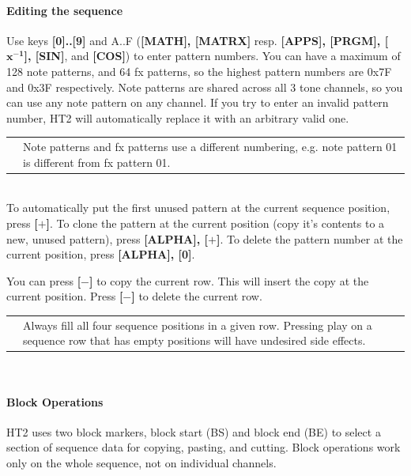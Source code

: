 \documentclass[12pt]{report}	%
\newcommand*{\TakeFourierOrnament}[1]{{%
\fontencoding{U}\fontfamily{futs}\selectfont\char#1}}
\newcommand*{\danger}{\TakeFourierOrnament{66}}
\begin{document}
\paragraph{Editing the sequence} Use keys \textbf{[0]..[9]} and A..F (\textbf{[MATH], [MATRX]} resp. \textbf{[APPS], [PRGM], [$\bm{x^{-1}}$], [SIN]}, and \textbf{[COS]}) to enter pattern numbers. You can have a maximum of 128 note patterns, and 64 fx patterns, so the highest pattern numbers are 0x7F and 0x3F respectively. Note patterns are shared across all 3 tone channels, so you can use any note pattern on any channel. If you try to enter an invalid pattern number, HT2 will automatically replace it with an arbitrary valid one.

\begin{tabularx}{\textwidth}{m{} X}
{\textcolor{red}{\newline\Huge\danger}} & Note patterns and fx patterns use a different numbering, e.g. note pattern 01 is different from fx pattern 01. \\
\end{tabularx} ~\\

To automatically put the first unused pattern at the current sequence position, press \textbf{[$\bm{+}$]}. To clone the pattern at the current position (copy it's contents to a new, unused pattern), press \textbf{[ALPHA], [$\bm{+}$]}. To delete the pattern number at the current position, press \textbf{[ALPHA], [0]}.

You can press \textbf{[$\bm{-}$]} to copy the current row. This will insert the copy at the current position. Press \textbf{[$\bm{-}$]} to delete the current row.

\begin{tabularx}{\textwidth}{m{} X}
\Huge{\textcolor{red}{\newline\danger}} & Always fill all four sequence positions in a given row. Pressing play on a sequence row that has empty positions will have undesired side effects. \\
\end{tabularx} ~\\

\paragraph{Block Operations} HT2 uses two block markers, block start (BS) and block end (BE) to select a section of sequence data for copying, pasting, and cutting. Block operations work only on the whole sequence, not on individual channels.
\end{document}
